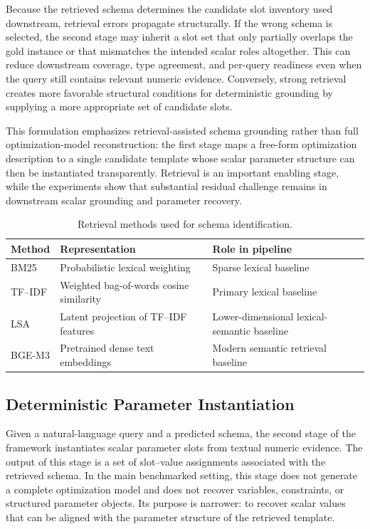 \documentclass[3p]{elsarticle}
\begin{document}
Because the retrieved schema determines the candidate slot inventory used downstream, retrieval errors propagate structurally. If the wrong schema is selected, the second stage may inherit a slot set that only partially overlaps the gold instance or that mismatches the intended scalar roles altogether. This can reduce downstream coverage, type agreement, and per-query readiness even when the query still contains relevant numeric evidence. Conversely, strong retrieval creates more favorable structural conditions for deterministic grounding by supplying a more appropriate set of candidate slots.

This formulation emphasizes retrieval-assisted schema grounding rather than full optimization-model reconstruction: the first stage maps a free-form optimization description to a single candidate template whose scalar parameter structure can then be instantiated transparently. Retrieval is an important enabling stage, while the experiments show that substantial residual challenge remains in downstream scalar grounding and parameter recovery.

\begin{table}[t]
\centering
\caption{Retrieval methods used for schema identification.}
\label{tab:retrieval_backbones}
\small
\begin{tabularx}{\linewidth}{l l X}
\toprule
Method & Representation & Role in pipeline \\
\midrule
BM25 & Probabilistic lexical weighting & Sparse lexical baseline \\
TF--IDF & Weighted bag-of-words cosine similarity & Primary lexical baseline \\
LSA & Latent projection of TF--IDF features & Lower-dimensional lexical-semantic baseline \\
BGE-M3 & Pretrained dense text embeddings & Modern semantic retrieval baseline \\
\bottomrule
\end{tabularx}
\end{table}

\subsection{Deterministic Parameter Instantiation}
\label{subsec:method_instantiation}

Given a natural-language query and a predicted schema, the second stage of the framework instantiates scalar parameter slots from textual numeric evidence. The output of this stage is a set of slot--value assignments associated with the retrieved schema. In the main benchmarked setting, this stage does not generate a complete optimization model and does not recover variables, constraints, or structured parameter objects. Its purpose is narrower: to recover scalar values that can be aligned with the parameter structure of the retrieved template.
\end{document}
